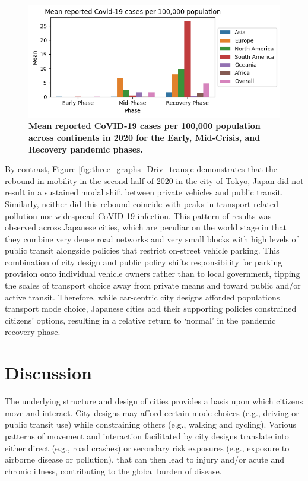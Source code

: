 \documentclass[preprint,12pt]{elsarticle}
\begin{document}
\begin{figure}
\centering

\includegraphics[trim={0 0 0 0},clip,scale=0.8]{Images/covidCases7Ave_plot.png}
\caption{\bf Mean reported CoVID-19 cases per 100,000 population across  continents in 2020 for the Early, Mid-Crisis, and Recovery pandemic phases.}  
 \label{fig:covidCases7Ave}
\end{figure}

By contrast, Figure \ref{fig:three_graphs_Driv_trans}c demonstrates that the rebound in mobility in the second half of 2020 in the city of Tokyo, Japan did not result in a sustained modal shift between private vehicles and public transit. Similarly, neither did this rebound coincide with peaks in transport-related pollution nor widespread CoVID-19 infection. This pattern of results was observed across Japanese cities, which are peculiar on the world stage in that they combine very dense road networks and very small blocks with high levels of public transit alongside policies that restrict on-street vehicle parking\cite{clements2019socialising}. This combination of city design and public policy shifts responsibility for parking provision onto individual vehicle owners rather than to local government, tipping the scales of transport choice away from private means and toward public and/or active transit. Therefore, while car-centric city designs afforded populations transport mode choice, Japanese cities and their supporting policies constrained citizens' options, resulting in a relative return to `normal' in the pandemic recovery phase.


\section*{Discussion}
The underlying structure and design of cities provides a basis upon which citizens move and interact. City designs may afford certain mode choices (e.g., driving or public transit use) while constraining others (e.g., walking and cycling). Various patterns of movement and interaction facilitated by city designs translate into either direct (e.g., road crashes) or secondary risk exposures (e.g., exposure to airborne disease or pollution), that can then lead to injury and/or acute and chronic illness, contributing to the global burden of disease.
\end{document}
